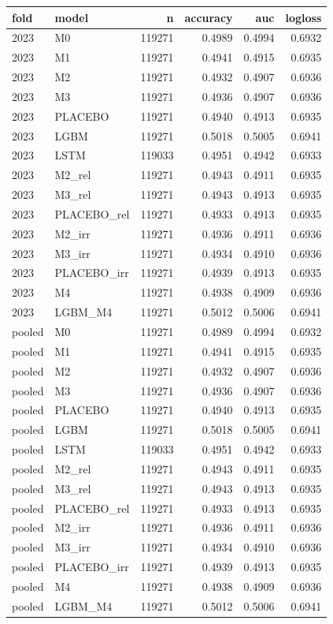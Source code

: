 \begin{tabular}{llrrrr}
\toprule
fold & model & n & accuracy & auc & logloss \\
\midrule
2023 & M0 & 119271 & 0.4989 & 0.4994 & 0.6932 \\
2023 & M1 & 119271 & 0.4941 & 0.4915 & 0.6935 \\
2023 & M2 & 119271 & 0.4932 & 0.4907 & 0.6936 \\
2023 & M3 & 119271 & 0.4936 & 0.4907 & 0.6936 \\
2023 & PLACEBO & 119271 & 0.4940 & 0.4913 & 0.6935 \\
2023 & LGBM & 119271 & 0.5018 & 0.5005 & 0.6941 \\
2023 & LSTM & 119033 & 0.4951 & 0.4942 & 0.6933 \\
2023 & M2\_rel & 119271 & 0.4943 & 0.4911 & 0.6935 \\
2023 & M3\_rel & 119271 & 0.4943 & 0.4913 & 0.6935 \\
2023 & PLACEBO\_rel & 119271 & 0.4933 & 0.4913 & 0.6935 \\
2023 & M2\_irr & 119271 & 0.4936 & 0.4911 & 0.6936 \\
2023 & M3\_irr & 119271 & 0.4934 & 0.4910 & 0.6936 \\
2023 & PLACEBO\_irr & 119271 & 0.4939 & 0.4913 & 0.6935 \\
2023 & M4 & 119271 & 0.4938 & 0.4909 & 0.6936 \\
2023 & LGBM\_M4 & 119271 & 0.5012 & 0.5006 & 0.6941 \\
pooled & M0 & 119271 & 0.4989 & 0.4994 & 0.6932 \\
pooled & M1 & 119271 & 0.4941 & 0.4915 & 0.6935 \\
pooled & M2 & 119271 & 0.4932 & 0.4907 & 0.6936 \\
pooled & M3 & 119271 & 0.4936 & 0.4907 & 0.6936 \\
pooled & PLACEBO & 119271 & 0.4940 & 0.4913 & 0.6935 \\
pooled & LGBM & 119271 & 0.5018 & 0.5005 & 0.6941 \\
pooled & LSTM & 119033 & 0.4951 & 0.4942 & 0.6933 \\
pooled & M2\_rel & 119271 & 0.4943 & 0.4911 & 0.6935 \\
pooled & M3\_rel & 119271 & 0.4943 & 0.4913 & 0.6935 \\
pooled & PLACEBO\_rel & 119271 & 0.4933 & 0.4913 & 0.6935 \\
pooled & M2\_irr & 119271 & 0.4936 & 0.4911 & 0.6936 \\
pooled & M3\_irr & 119271 & 0.4934 & 0.4910 & 0.6936 \\
pooled & PLACEBO\_irr & 119271 & 0.4939 & 0.4913 & 0.6935 \\
pooled & M4 & 119271 & 0.4938 & 0.4909 & 0.6936 \\
pooled & LGBM\_M4 & 119271 & 0.5012 & 0.5006 & 0.6941 \\
\bottomrule
\end{tabular}
